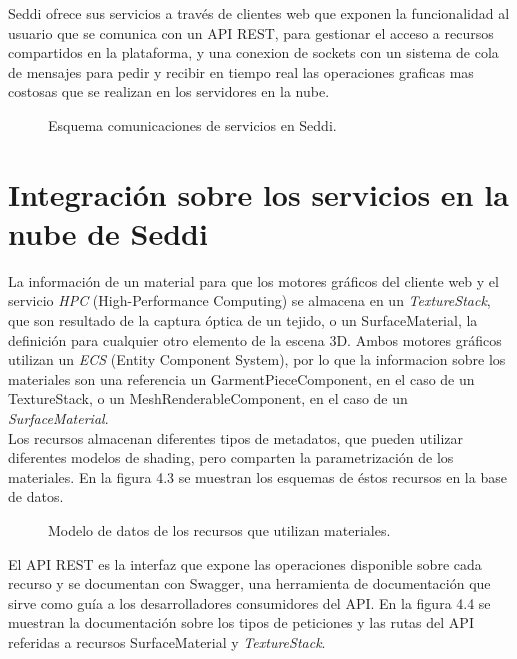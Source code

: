     Seddi ofrece sus servicios a trav\'es de clientes web que exponen la funcionalidad al usuario que se comunica con un API
    REST, para gestionar el acceso a recursos compartidos en la plataforma, y una conexion de sockets con un sistema de cola de
    mensajes para pedir y recibir en tiempo real las operaciones graficas mas costosas que se realizan en los servidores en la nube.

    \begin{figure}[H]
      \vspace{1cm}
      \centering
      \caption{Esquema comunicaciones de servicios en Seddi.}
      \vspace{1.5cm}
    \end{figure}

  \egroup

  \section{Integraci\'on sobre los servicios en la nube de Seddi}
  La informaci\'on de un material para que los motores gr\'aficos del cliente web y el servicio \textit{HPC} (High-Performance Computing)
  se almacena en un \textit{TextureStack}, que son resultado de la captura \'optica de un tejido, o un SurfaceMaterial, la definici\'on para
  cualquier otro elemento de la escena 3D. Ambos motores gr\'aficos utilizan un \textit{ECS} (Entity Component System), por lo que
  la informacion sobre los materiales son una referencia un GarmentPieceComponent, en el caso de un TextureStack,
  o un MeshRenderableComponent, en el caso de un \textit{SurfaceMaterial}.\\
  Los recursos almacenan diferentes tipos de metadatos, que pueden utilizar diferentes modelos de shading, pero
  comparten la parametrizaci\'on de los materiales. En la figura 4.3 se muestran los esquemas de \'estos recursos en la
  base de datos.\\

  \begin{figure}[H]
    \vspace{0.5cm}
    \centering
    \caption{Modelo de datos de los recursos que utilizan materiales.}
    \vspace{0.5cm}
  \end{figure}
  

  El API REST es la interfaz que expone las operaciones disponible sobre cada recurso y se documentan con Swagger,
  una herramienta de documentaci\'on que sirve como gu\'ia a los desarrolladores consumidores del API. En
  la figura 4.4 se muestran la documentaci\'on sobre los tipos de peticiones y las rutas del API referidas a recursos
  SurfaceMaterial y \textit{TextureStack}.\\
  

